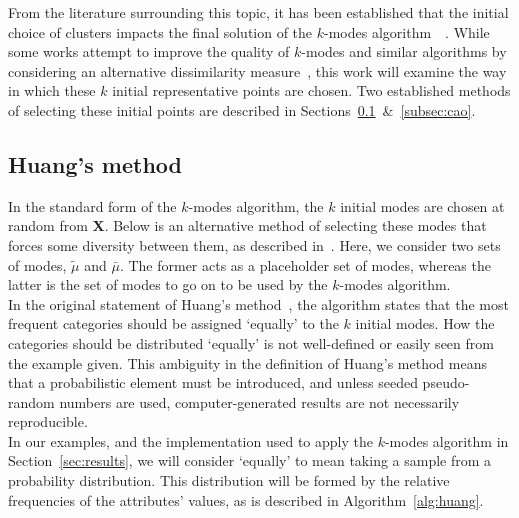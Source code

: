 From the literature surrounding this topic, it has been established that the 
initial choice of clusters impacts the final solution of the \(k\)-modes
algorithm~\cite{Huang98}~\cite{Cao09}. While some works attempt to improve the 
quality of \(k\)-modes and similar algorithms by considering an alternative 
dissimilarity measure~\cite{Ng07}, this work will examine the way in which these
\(k\) initial representative points are chosen. Two established methods of 
selecting these initial points are described in
Sections~\ref{subsec:huang}~\&~\ref{subsec:cao}.\\


\subsection{Huang's method}\label{subsec:huang}

In the standard form of the \(k\)-modes algorithm, the \(k\) initial modes are 
chosen at random from \textbf{X}. Below is an alternative method of selecting
these modes that forces some diversity between them, as described 
in~\cite{Huang98}. Here, we consider two sets of modes, \(\tilde{\mu}\) and
\(\bar{\mu}\). The former acts as a placeholder set of modes, whereas the latter
is the set of modes to go on to be used by the \(k\)-modes algorithm.\\

 

In the original statement of Huang's method~\cite{Huang98}, the algorithm states
that the most frequent categories should be assigned `equally' to the \(k\) 
initial modes. How the categories should be distributed `equally' is not 
well-defined or easily seen from the example given. This ambiguity in the 
definition of Huang's method means that a probabilistic element must be 
introduced, and unless seeded pseudo-random numbers are used, computer-generated
results are not necessarily reproducible.\\

In our examples, and the implementation used to apply the \(k\)-modes algorithm
in Section~\ref{sec:results}, we will consider `equally' to mean taking a sample
from a probability distribution. This distribution will be formed by the
relative frequencies of the attributes' values, as is described in
Algorithm~\ref{alg:huang}.\\

